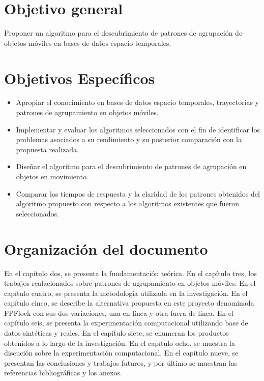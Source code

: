 \section{Objetivo general}

Proponer un algoritmo para el descubrimiento de patrones de agrupación de objetos móviles en bases 
de datos espacio temporales.

\section{Objetivos Específicos}

\begin{itemize}
 \item Apropiar el conocimiento en bases de datos espacio temporales, trayectorias y patrones de 
agrupamiento en objetos móviles.
 \item Implementar y evaluar los algoritmos seleccionados con el fin de identificar los problemas 
asociados a su rendimiento y su posterior comparación con la propuesta realizada.
 \item Diseñar el algoritmo para el descubrimiento de patrones de agrupación en objetos en 
movimiento.
 \item  Comparar los tiempos de respuesta y la claridad de los patrones obtenidos del algoritmo 
propuesto con respecto a los algoritmos existentes que fueron seleccionados.
\end{itemize}


\section{Organización del documento}

En el capítulo dos, se presenta la fundamentación teórica. En el capítulo tres, los trabajos 
realacionados sobre patrones de agrupamiento en objetos móviles. En el capítulo cuatro, se presenta
la metodología utilizada en la investigación. En el capítulo cinco, se describe la
alternativa propuesta en este proyecto denominada FPFlock con sus dos variaciones, una en línea y 
otra fuera de línea. En el capítulo seis, se presenta la experimentación computacional utilizando 
base de datos sintéticas y reales. En el capítulo siete, se enumeran los productos obtenidos a lo 
largo de la investigación. En el capítulo ocho, se muestra la discución sobre la experimentación 
computacional. En el capítulo nueve, se presentan las conclusiones y trabajos futuros, y por 
último se muestran las referencias bibliográficas y los anexos.  

